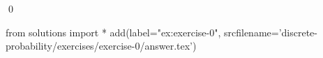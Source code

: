 
\begin{ex} 
  \label{ex:exercise-0}
  
  \qed
\end{ex} 
\begin{python0}
from solutions import *
add(label="ex:exercise-0",
    srcfilename='discrete-probability/exercises/exercise-0/answer.tex') 
\end{python0}
